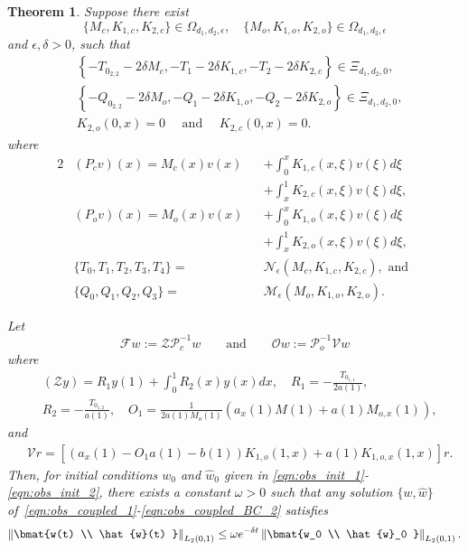 \documentclass[9pt,journal,twocolumn]{IEEEtran}
\newtheorem{theorem}{Theorem}
\newcommand{\igzo}{\int_0^1}
\newcommand{\igzx}{\int_0^x}
\newcommand{\igxo}{\int_x^1}
\newcommand{\wh}{\hat{w}}
\newcommand{\lt}{L_2(0,1)}
\begin{document}
\begin{theorem}\label{observer_synth_colloc}
Suppose there exist
\[
\{M_c,K_{1,c},K_{2,c}\} \in \Omega_{d_1,d_2,\epsilon},\quad \{M_o,K_{1,o},K_{2,o}\} \in \Omega_{d_1,d_2,\epsilon} 
\] and $\epsilon, \delta >0$,
such that
\begin{align*}
& \left\{-T_{0_{2,2}}-2\delta M_c, -T_1-2\delta K_{1,c}, -T_2- 2\delta K_{2,c} \right\} \in \Xi_{d_1,d_2,0}, \\
& \left\{-Q_{0_{2,2}}-2\delta M_o, -Q_1-2\delta K_{1,o}, -Q_2-2\delta K_{2,o} \right\} \in \Xi_{d_1,d_2,0}, \\
 &K_{2,o}(0,x)=0 \quad \text{ and }\quad K_{2,c}(0,x)=0.
\end{align*}
where
\begin{alignat*}{2}
 &(P_c v)(x)= M_c(x)v(x) &&+ \igzx K_{1,c}(x,\xi) v(\xi) d \xi  \\
 &\qquad \qquad \qquad &&+ \igxo K_{2,c}(x,\xi) v(\xi) d \xi,\\
 &(P_o v)(x)= M_o(x)v(x) &&+ \igzx K_{1,o}(x,\xi) v(\xi) d \xi \\
 &\qquad \qquad \qquad &&+ \igxo K_{2,o}(x,\xi) v(\xi) d \xi,\\
&\{T_0,T_1,T_2,T_3,T_4\}=&&\mathcal{N}_\epsilon(M_c,K_{1,c},K_{2,c}),\text{ and }\\
&\{Q_0,Q_1,Q_2,Q_3\}=&&\mathcal{M}_\epsilon(M_o,K_{1,o},K_{2,o}).
\end{alignat*}

Let
\[
\mathcal{F}w:=\mathcal{Z}\mathcal{P}^{-1}_c w \qquad \text{and}\qquad \mathcal{O}w:=\mathcal{P}_o^{-1}\mathcal{V}w
\] 
where
\begin{align*}
&(\mathcal{Z}y)=R_1y(1)+\igzo R_2(x)y(x)dx, \quad R_1=-\frac{T_{0_{1,1}}}{2 a(1)},\\
&  R_2=-\frac{T_{0_{1,2}}}{a(1)},\quad O_1=\frac{1}{2a(1)M_o(1)}\left(a_x(1)M(1)+a(1)M_{o,x}(1) \right),
\end{align*} and
\begin{align*}
&\mathcal{V}r=\left[\left(a_x(1)-O_1 a(1)-b(1) \right)K_{1,o}(1,x)+a(1)K_{1,o,x}(1,x) \right]r.
\end{align*}
Then, for initial conditions $w_0$ and $\wh_0$ given in \eqref{eqn:obs_init_1}-\eqref{eqn:obs_init_2}, there exists a constant $\omega>0$ such that any solution $\{w,\hat w\}$ of~\eqref{eqn:obs_coupled_1}-\eqref{eqn:obs_coupled_BC_2} satisfies
\[
  \left\|\bmat{w(t) \\ \wh(t) }\right\|_{\lt} \leq \omega e^{-\delta t} \left\|\bmat{w_0 \\ \wh_0 }\right\|_{\lt}.
\]

\end{theorem}
\end{document}
